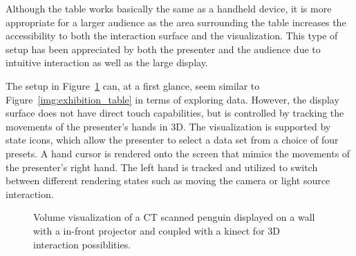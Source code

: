 \documentclass[review,journal]{vgtc}         %
\begin{document}
Although the table works basically the same as a handheld device, it is more appropriate for a larger audience as the area surrounding the table increases the accessibility to both the interaction surface and the visualization.
This type of setup has been appreciated by both the presenter and the audience due to intuitive interaction as well as the large display.


The setup in Figure~\ref{img:exhibition_kinect} can, at a first glance, seem similar to Figure~\ref{img:exhibition_table} in terms of exploring data.
However, the display surface does not have direct touch capabilities, but is controlled by tracking the movements of the presenter's hands in 3D.
The visualization is supported by state icons, which allow the presenter to select a data set from a choice of four presets.
A hand cursor is rendered onto the screen that mimics the movements of the presenter's right hand.
The left hand is tracked and utilized to switch between different rendering states such as moving the camera or light source interaction.

\begin{figure}[tb]
	\centering
	\caption{Volume visualization of a CT scanned penguin displayed on a wall with a in-front projector and coupled with a kinect for 3D interaction possiblities.}
	\label{img:exhibition_kinect}
\end{figure}
\end{document}
